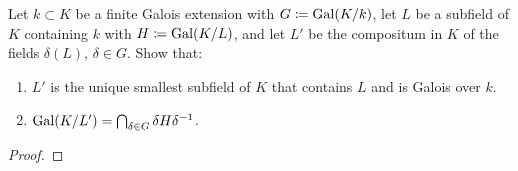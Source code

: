 \begin{problem}
  Let $k\subset K$ be a finite Galois extension with $G\coloneq\operatorname{Gal}(K/k)$,
  let $L$ be a subfield of $K$ containing $k$ with $H\coloneq\operatorname{Gal}(K/L)$,
  and let $L'$ be the compositum in $K$ of the fields $\delta(L)$,
  $\delta\in G$. Show that:
\begin{enumerate}[label=(\alph*),noitemsep]
\item $L'$ is the unique smallest subfield of $K$ that contains
  $L$ and is Galois over $k$.
\item $\operatorname{Gal}(K/L')=\bigcap_{\delta\in G}\delta H\delta^{-1}$.
\end{enumerate}
\end{problem}
\begin{proof}
\end{proof}

